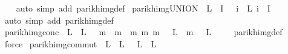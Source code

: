 \begin{isabellebody}
%
\isadelimproof
\ \ %
\endisadelimproof
%
\isatagproof
{}\isamarkupfalse%
\ {\isacharparenleft}{\kern0pt}auto\ simp\ add{\isacharcolon}{\kern0pt}\ parikh{\isacharunderscore}{\kern0pt}img{\isacharunderscore}{\kern0pt}def{\isacharparenright}{\kern0pt}%
\endisatagproof
{\isafoldproof}%
%
\isadelimproof
\isanewline
%
\endisadelimproof
\isanewline
{}\isamarkupfalse%
\ parikh{\isacharunderscore}{\kern0pt}img{\isacharunderscore}{\kern0pt}UNION{\isacharcolon}{\kern0pt}\ {\isachardoublequoteopen}{\isasymPsi}\ {\isacharparenleft}{\kern0pt}{\isasymUnion}{\isacharparenleft}{\kern0pt}L\ {\isacharbackquote}{\kern0pt}\ I{\isacharparenright}{\kern0pt}{\isacharparenright}{\kern0pt}\ {\isacharequal}{\kern0pt}\ {\isasymUnion}\ {\isacharparenleft}{\kern0pt}{\isacharparenleft}{\kern0pt}{\isasymlambda}i{\isachardot}{\kern0pt}\ {\isasymPsi}\ {\isacharparenleft}{\kern0pt}L\ i{\isacharparenright}{\kern0pt}{\isacharparenright}{\kern0pt}\ {\isacharbackquote}{\kern0pt}\ I{\isacharparenright}{\kern0pt}{\isachardoublequoteclose}\isanewline
%
\isadelimproof
\ \ %
\endisadelimproof
%
\isatagproof
{}\isamarkupfalse%
\ {\isacharparenleft}{\kern0pt}auto\ simp\ add{\isacharcolon}{\kern0pt}\ parikh{\isacharunderscore}{\kern0pt}img{\isacharunderscore}{\kern0pt}def{\isacharparenright}{\kern0pt}%
\endisatagproof
{\isafoldproof}%
%
\isadelimproof
\isanewline
%
\endisadelimproof
\isanewline
{}\isamarkupfalse%
\ parikh{\isacharunderscore}{\kern0pt}img{\isacharunderscore}{\kern0pt}conc{\isacharcolon}{\kern0pt}\ {\isachardoublequoteopen}{\isasymPsi}\ {\isacharparenleft}{\kern0pt}L{}\ {\isacharat}{\kern0pt}{\isacharat}{\kern0pt}\ L{}{\isacharparenright}{\kern0pt}\ {\isacharequal}{\kern0pt}\ {\isacharbraceleft}{\kern0pt}\ m{}\ {\isacharplus}{\kern0pt}\ m{}\ {\isacharbar}{\kern0pt}\ m{}\ m{}{\isachardot}{\kern0pt}\ m{}\ {\isasymin}\ {\isasymPsi}\ L{}\ {\isasymand}\ m{}\ {\isasymin}\ {\isasymPsi}\ L{}\ {\isacharbraceright}{\kern0pt}{\isachardoublequoteclose}\isanewline
%
\isadelimproof
\ \ %
\endisadelimproof
%
\isatagproof
{}\isamarkupfalse%
\ parikh{\isacharunderscore}{\kern0pt}img{\isacharunderscore}{\kern0pt}def\ \isamarkupfalse%
\ force%
\endisatagproof
{\isafoldproof}%
%
\isadelimproof
\isanewline
%
\endisadelimproof
\isanewline
{}\isamarkupfalse%
\ parikh{\isacharunderscore}{\kern0pt}img{\isacharunderscore}{\kern0pt}commut{\isacharcolon}{\kern0pt}\ {\isachardoublequoteopen}{\isasymPsi}\ {\isacharparenleft}{\kern0pt}L{}\ {\isacharat}{\kern0pt}{\isacharat}{\kern0pt}\ L{}{\isacharparenright}{\kern0pt}\ {\isacharequal}{\kern0pt}\ {\isasymPsi}\ {\isacharparenleft}{\kern0pt}L{}\ {\isacharat}{\kern0pt}{\isacharat}{\kern0pt}\ L{}{\isacharparenright}{\kern0pt}{\isachardoublequoteclose}\isanewline

\end{isabellebody}

